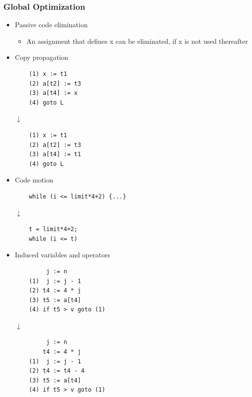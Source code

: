 \subsubsection{Global Optimization}
\begin{itemize}
	\item Passive code elimination
\begin{itemize}
	\item An assignment that defines x can be eliminated, if x is not used thereafter
\end{itemize}
	\item Copy propagation
\begin{verbatim}
	(1) x := t1
	(2) a[t2] := t3
	(3) a[t4] := x
	(4) goto L
\end{verbatim}
\begin{center}$\downarrow$\end{center}
\begin{verbatim}
	(1) x := t1
	(2) a[t2] := t3
	(3) a[t4] := t1
	(4) goto L
\end{verbatim}
	\item Code motion
\begin{verbatim}
	while (i <= limit*4+2) {...}
\end{verbatim}
\begin{center}$\downarrow$\end{center}
\begin{verbatim}
	t = limit*4+2;
	while (i <= t)
\end{verbatim}
	\item Induced variables and operators
\begin{verbatim}
	     j := n
	(1)  j := j - 1
	(2) t4 := 4 * j
	(3) t5 := a[t4]
	(4) if t5 > v goto (1)
\end{verbatim}
\begin{center}$\downarrow$\end{center}
\begin{verbatim}
	     j := n
	    t4 := 4 * j
	(1)  j := j - 1
	(2) t4 := t4 - 4
	(3) t5 := a[t4]
	(4) if t5 > v goto (1)	
\end{verbatim}
\end{itemize}

